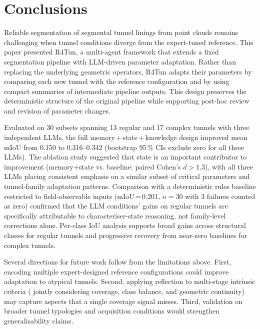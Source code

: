 \documentclass[a4paper,fleqn]{cas-dc}
\begin{document}
\section{Conclusions}\label{sec:conclusions}

Reliable segmentation of segmental tunnel linings from point clouds remains challenging when tunnel conditions diverge from the expert-tuned reference. This paper presented R4Tun, a multi-agent framework that extends a fixed segmentation pipeline with LLM-driven parameter adaptation. Rather than replacing the underlying geometric operators, R4Tun adapts their parameters by comparing each new tunnel with the reference configuration and by using compact summaries of intermediate pipeline outputs. This design preserves the deterministic structure of the original pipeline while supporting post-hoc review and revision of parameter changes.

Evaluated on 30 subsets spanning 13 regular and 17 complex tunnels with three independent LLMs, the full memory\,+\,state\,+\,knowledge design improved mean mIoU from 0.150 to 0.316--0.342 (bootstrap 95\,\% CIs exclude zero for all three LLMs). The ablation study suggested that state is an important contributor to improvement (memory+state vs. baseline: paired Cohen's $d > 1.3$), with all three LLMs placing consistent emphasis on a similar subset of critical parameters and tunnel-family adaptation patterns. Comparison with a deterministic rules baseline restricted to field-observable inputs (mIoU\,=\,0.201, $n=30$ with 3 failures counted as zero) confirmed that the LLM conditions' gains on regular tunnels are specifically attributable to characteriser-state reasoning, not family-level corrections alone. Per-class IoU analysis supports broad gains across structural classes for regular tunnels and progressive recovery from near-zero baselines for complex tunnels.

Several directions for future work follow from the limitations above. First, encoding multiple expert-designed reference configurations could improve adaptation to atypical tunnels. Second, applying reflection to multi-stage intrinsic criteria ( jointly considering coverage, class balance, and geometric continuity) may capture aspects that a single coverage signal misses. Third, validation on broader tunnel typologies and acquisition conditions would strengthen generalisability claims.

\end{document}
